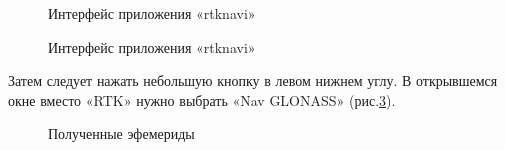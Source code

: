 \documentclass[]{article}
\begin{document}
		\begin{figure}[h!]
		\caption{Интерфейс приложения «rtknavi»}
		\label{interf_rtknavi}
	\end{figure}
	\begin{figure}[h!]
	
	\caption{Интерфейс приложения «rtknavi»}
	\label{interf_rtknavi_2}
	\end{figure}
	
	Затем следует нажать небольшую кнопку в левом нижнем углу. В открывшемся окне вместо «RTK» нужно выбрать «Nav GLONASS» (рис.\ref{efem}).
	 \begin{figure}[h!]
	 	
	 	\caption{Полученные эфемериды}
	 	\label{efem}
	 \end{figure}
 \newpage
\end{document}
